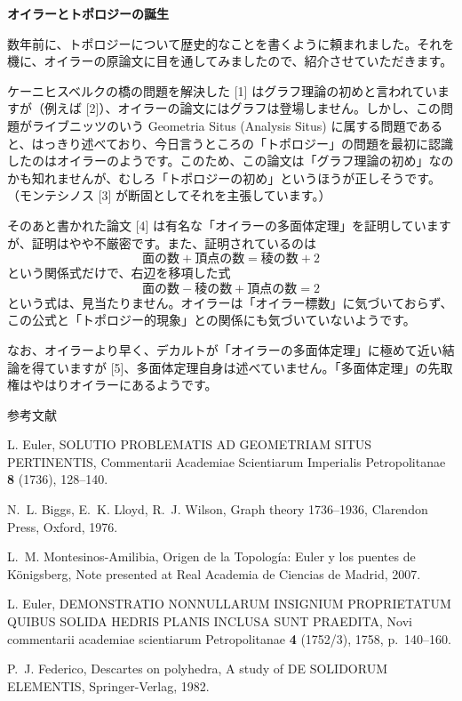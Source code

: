 \documentclass[uplatex,dvipdfmx]{jlreq}
\begin{document}
\newpage

\begin{center}
{\large\bfseries オイラーとトポロジーの誕生}\\[6pt]
\hspace*{\fill}{\large\bfseries 松本　幸夫（学習院大学理学部）}
\end{center}

数年前に、トポロジーについて歴史的なことを書くように頼まれました。それを機に、オイラーの原論文に目を通してみましたので、紹介させていただきます。

ケーニヒスベルクの橋の問題を解決した [1] はグラフ理論の初めと言われていますが（例えば [2]）、オイラーの論文にはグラフは登場しません。しかし、この問題がライブニッツのいう Geometria Situs (Analysis Situs) に属する問題であると、はっきり述べており、今日言うところの「トポロジー」の問題を最初に認識したのはオイラーのようです。このため、この論文は「グラフ理論の初め」なのかも知れませんが、むしろ「トポロジーの初め」というほうが正しそうです。（モンテシノス [3] が断固としてそれを主張しています。）

そのあと書かれた論文 [4] は有名な「オイラーの多面体定理」を証明していますが、証明はやや不厳密です。また、証明されているのは
\[
\mbox{面の数}+\mbox{頂点の数}=\mbox{稜の数}+2
\]
という関係式だけで、右辺を移項した式
\[
\mbox{面の数}-\mbox{稜の数}+\mbox{頂点の数}=2
\]
という式は、見当たりません。オイラーは「オイラー標数」に気づいておらず、この公式と「トポロジー的現象」との関係にも気づいていないようです。

なお、オイラーより早く、デカルトが「オイラーの多面体定理」に極めて近い結論を得ていますが [5]、多面体定理自身は述べていません。「多面体定理」の先取権はやはりオイラーにあるようです。

\begin{center}\textsc{参考文献}\end{center}
\begin{enumerate}[{[1]}]
  \item L. Euler, SOLUTIO PROBLEMATIS AD GEOMETRIAM SITUS PERTINENTIS, Commentarii Academiae Scientiarum Imperialis Petropolitanae \textbf{8} (1736), 128--140.
  \item N.~L. Biggs, E.~K. Lloyd, R.~J. Wilson, Graph theory 1736--1936, Clarendon Press, Oxford, 1976.
  \item L.~M. Montesinos-Amilibia, Origen de la Topología: Euler y los puentes de Königsberg, Note presented at Real Academia de Ciencias de Madrid, 2007.
  \item L. Euler, DEMONSTRATIO NONNULLARUM INSIGNIUM PROPRIETATUM QUIBUS SOLIDA HEDRIS PLANIS INCLUSA SUNT PRAEDITA, Novi commentarii academiae scientiarum Petropolitanae \textbf{4} (1752/3), 1758, p.~140--160.
  \item P.~J. Federico, Descartes on polyhedra, A study of DE SOLIDORUM ELEMENTIS, Springer-Verlag, 1982.
\end{enumerate}
\end{document}
